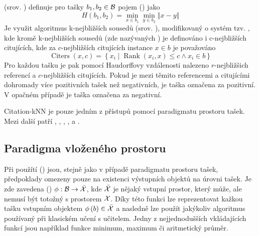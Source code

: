  (srov. \cite{wang_solving_2000}) definuje pro tašky \( b_1, b_2 \in \mathcal B \) pojem  () jako
\[ H \left( b_1, b_2 \right) = \min_{x \in b_1} \min_{y \in b_2} \left\Vert x - y \right\Vert \]
Je využit algoritmus k-nejbližších sousedů (srov. \cite{dasarathy_nearest_1991}), modifikovaný o systém tzv. , kde kromě k-nejbližších sousedů (zde nazývaných ) je definováno i c-nejbližších citujících, kde za \( c \)-nejbližších citujících instance \( x \in b \) je považováno
\[ \operatorname{Citers} \left( x, c \right) = \left\{ x_i \middle| \operatorname{Rank} \left( x_i, x \right) \leq c \land x_i \in b \right\} \]
Pro každou tašku je pak pomocí Haudorffovy vzdálenosti nalezeno \( r \)-nejbližšich referencí a \( c \)-nejbližších citujících. Pokud je mezi těmito referencemi a citujícími dohromady více pozitivních tašek než negativních, je taška označena za pozitivní. V opačném případě je taška označena za negativní.

Citation-kNN je pouze jedním z přístupů pomocí paradigmatu prostoru tašek. Mezi další patří \cite{wang_solving_2000}, \cite{kwok_marginalized_2007}, \cite{gartner_multi-instance_2002}, \cite{haussler_convolution_1999}, \cite{zhou_multi-instance_2009} a \cite{muandet_learning_2012}.

\subsection{Paradigma vloženého prostoru}\label{embedded-space-paradigm}

Při použítí  () jsou, stejně jako v případě paradigmatu prostoru tašek, předpoklady omezeny pouze na existenci výstupních objektů na úrovni tašek. Je zde zavedena  () \( \phi : \mathcal B \to \bar{\mathcal X} \), kde \( \bar{\mathcal X} \) je nějaký vstupní prostor, který může, ale nemusí být totožný s prostorem \( \mathcal X \). Díky této funkci lze reprezentovat kažkou tašku vstupním objektem \( \phi \left( b \right) \in \bar{\mathcal X} \) a nasledně lze použít jakýkoliv algoritmus používaný při klasickém učení s učitelem. Jedny z nejjednodušších vkládajících funkcí jsou například funkce minimum, maximum či aritmetický průměr.

